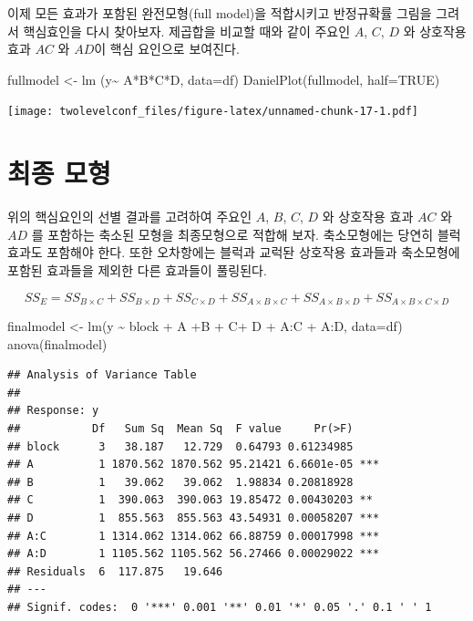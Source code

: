 \documentclass[
]{book}
\newenvironment{Shaded}{\begin{snugshade}}{\end{snugshade}}
\newcommand{\AttributeTok}[1]{\textcolor[rgb]{0.77,0.63,0.00}{#1}}
\newcommand{\ConstantTok}[1]{\textcolor[rgb]{0.00,0.00,0.00}{#1}}
\newcommand{\FunctionTok}[1]{\textcolor[rgb]{0.00,0.00,0.00}{#1}}
\newcommand{\NormalTok}[1]{#1}
\newcommand{\OtherTok}[1]{\textcolor[rgb]{0.56,0.35,0.01}{#1}}
\newcommand{\SpecialCharTok}[1]{\textcolor[rgb]{0.00,0.00,0.00}{#1}}
\begin{document}
이제 모든 효과가 포함된 완전모형(full model)을 적합시키고 반정규확률 그림을 그려서 핵심효인을 다시 찾아보자.
제곱합을 비교할 때와 같이 주요인 \(A\), \(C\), \(D\) 와 상호작용 효과 \(AC\) 와 \(AD\)이 핵심 요인으로 보여진다.

\begin{Shaded}
\begin{Highlighting}[]
\NormalTok{fullmodel }\OtherTok{\textless{}{-}} \FunctionTok{lm}\NormalTok{ (y}\SpecialCharTok{\textasciitilde{}}\NormalTok{ A}\SpecialCharTok{*}\NormalTok{B}\SpecialCharTok{*}\NormalTok{C}\SpecialCharTok{*}\NormalTok{D, }\AttributeTok{data=}\NormalTok{df) }
\FunctionTok{DanielPlot}\NormalTok{(fullmodel, }\AttributeTok{half=}\ConstantTok{TRUE}\NormalTok{)}
\end{Highlighting}
\end{Shaded}

\texttt{[image: twolevelconf\_files/figure-latex/unnamed-chunk-17-1.pdf]}

\hypertarget{uxcd5cuxc885-uxbaa8uxd615}{%
\section{최종 모형}\label{uxcd5cuxc885-uxbaa8uxd615}}

위의 핵심요인의 선별 결과를 고려하여 주요인 \(A\), \(B\), \(C\), \(D\) 와 상호작용 효과 \(AC\) 와 \(AD\) 를 포함하는
축소된 모형을 최종모형으로 적합해 보자. 축소모형에는 당연히 블럭효과도 포함해야 한다. 또한 오차항에는 블럭과 교럭돤 상호작용 효과들과
축소모형에 포함된 효과들을 제외한 다른 효과들이 풀링된다.

\[ SS_E = SS_{B \times C} + SS_{B \times D} + SS_{C \times D} + SS_{A \times B \times C} + SS_{A \times B \times D } + SS_{A \times B \times C \times D}\]

\begin{Shaded}
\begin{Highlighting}[]
\NormalTok{finalmodel }\OtherTok{\textless{}{-}} \FunctionTok{lm}\NormalTok{(y }\SpecialCharTok{\textasciitilde{}}\NormalTok{ block }\SpecialCharTok{+}\NormalTok{ A }\SpecialCharTok{+}\NormalTok{B }\SpecialCharTok{+}\NormalTok{ C}\SpecialCharTok{+}\NormalTok{ D }\SpecialCharTok{+}\NormalTok{ A}\SpecialCharTok{:}\NormalTok{C }\SpecialCharTok{+}\NormalTok{ A}\SpecialCharTok{:}\NormalTok{D, }\AttributeTok{data=}\NormalTok{df)}
\FunctionTok{anova}\NormalTok{(finalmodel)}
\end{Highlighting}
\end{Shaded}

\begin{verbatim}
## Analysis of Variance Table
## 
## Response: y
##           Df   Sum Sq  Mean Sq  F value     Pr(>F)    
## block      3   38.187   12.729  0.64793 0.61234985    
## A          1 1870.562 1870.562 95.21421 6.6601e-05 ***
## B          1   39.062   39.062  1.98834 0.20818928    
## C          1  390.063  390.063 19.85472 0.00430203 ** 
## D          1  855.563  855.563 43.54931 0.00058207 ***
## A:C        1 1314.062 1314.062 66.88759 0.00017998 ***
## A:D        1 1105.562 1105.562 56.27466 0.00029022 ***
## Residuals  6  117.875   19.646                        
## ---
## Signif. codes:  0 '***' 0.001 '**' 0.01 '*' 0.05 '.' 0.1 ' ' 1
\end{verbatim}
\end{document}
